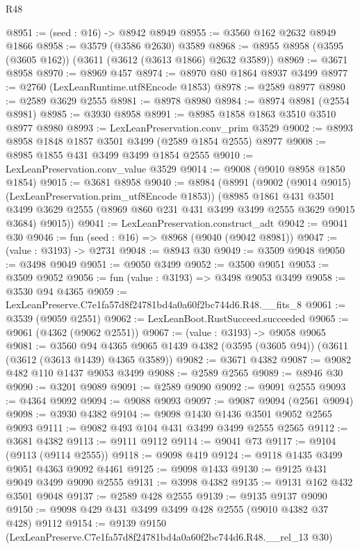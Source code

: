 \begin{lexlean}{R48}
\begin{coremodule}
@8951 := (seed : @16) -> @8942 @8949
@8955 := @3560 @162 @2632 @8949 @1866
@8958 := @3579 (@3586 @2630) @3589
@8968 := @8955 @8958 (@3595 (@3605 @162)) (@3611 (@3612 (@3613 @1866) @2632 @3589))
@8969 := @3671 @8958
@8970 := @8969 @457
@8974 := @8970 @80 @1864 @8937 @3499
@8977 := @2760 (LexLeanRuntime.utf8Encode @1853)
@8978 := @2589 @8977
@8980 := @2589 @3629 @2555
@8981 := @8978 @8980
@8984 := @8974 @8981 (@2554 @8981)
@8985 := @3930 @8958
@8991 := @8985 @1858 @1863 @3510 @3510 @8977 @8980
@8993 := LexLeanPreservation.conv_prim @3529
@9002 := @8993 @8958 @1848 @1857 @3501 @3499 (@2589 @1854 @2555) @8977
@9008 := @8985 @1855 @431 @3499 @3499 @1854 @2555
@9010 := LexLeanPreservation.conv_value @3529
@9014 := @9008 (@9010 @8958 @1850 @1854)
@9015 := @3681 @8958
@9040 := @8984
    (@8991
      (@9002 (@9014 @9015) (LexLeanPreservation.prim_utf8Encode @1853))
      (@8985
        @1861
        @431
        @3501
        @3499
        @3629
        @2555
        (@8969 @860 @231 @431 @3499 @3499 @2555 @3629 @9015 @3684)
        @9015))
@9041 := LexLeanPreservation.construct_adt
@9042 := @9041 @30
@9046 := fun (seed : @16) => @8968 (@9040 (@9042 @8981))
@9047 := (value : @3193) -> @2731
@9048 := @8943 @30
@9049 := @3509 @9048
@9050 := @3498 @9049
@9051 := @9050 @3499
@9052 := @3500 @9051
@9053 := @3509 @9052
@9056 := fun (value : @3193) => @3498 @9053 @3499
@9058 := @3530 @94 @4365
@9059 := LexLeanPreserve.C7e1fa57d8f24781bd4a0a60f2bc744d6.R48.__fits_8
@9061 := @3539 (@9059 @2551)
@9062 := LexLeanBoot.RustSucceed.succeeded
@9065 := @9061 (@4362 (@9062 @2551))
@9067 := (value : @3193) -> @9058 @9065
@9081 := @3560
    @94
    @4365
    @9065
    @1439
    @4382
    (@3595 (@3605 @94))
    (@3611 (@3612 (@3613 @1439) @4365 @3589))
@9082 := @3671 @4382
@9087 := @9082 @482 @110 @1437 @9053 @3499
@9088 := @2589 @2565
@9089 := @8946 @30
@9090 := @3201 @9089
@9091 := @2589 @9090
@9092 := @9091 @2555
@9093 := @4364 @9092
@9094 := @9088 @9093
@9097 := @9087 @9094 (@2561 @9094)
@9098 := @3930 @4382
@9104 := @9098 @1430 @1436 @3501 @9052 @2565 @9093
@9111 := @9082 @493 @104 @431 @3499 @3499 @2555 @2565
@9112 := @3681 @4382
@9113 := @9111 @9112
@9114 := @9041 @73
@9117 := @9104 (@9113 (@9114 @2555))
@9118 := @9098 @419
@9124 := @9118 @1435 @3499 @9051 @4363 @9092 @4461
@9125 := @9098 @1433
@9130 := @9125 @431 @9049 @3499 @9090 @2555
@9131 := @3998 @4382
@9135 := @9131 @162 @432 @3501 @9048
@9137 := @2589 @428 @2555
@9139 := @9135 @9137 @9090
@9150 := @9098 @429 @431 @3499 @3499 @428 @2555 (@9010 @4382 @37 @428) @9112
@9154 := @9139 @9150 (LexLeanPreserve.C7e1fa57d8f24781bd4a0a60f2bc744d6.R48.__rel_13 @30)

\end{coremodule}
\end{lexlean}
